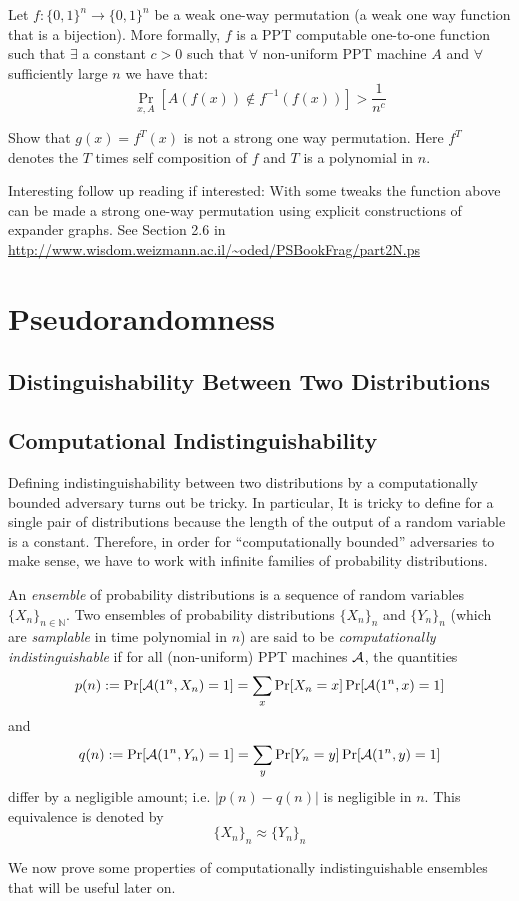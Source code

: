 \documentclass[12pt]{tufte-book}
\begin{document}
\begin{exercise}
 Let $f:\{0,1\}^n\to \{0,1\}^{n}$ be a weak one-way permutation (a weak one way function that is a bijection). More formally, $f$ is a PPT computable one-to-one function such that $\exists$ a constant $c >0$ such that $\forall$ non-uniform PPT machine $A$ and $\forall$ sufficiently large $n$ we have that:
    \[\Pr_{x,A}[A(f(x)) \not\in f^{-1}(f(x))] > \frac{1}{n^c}\]

     Show that $g(x) = f^T(x)$ is not a strong one way permutation. Here $f^T$ denotes the $T$ times self composition of $f$ and $T$ is a polynomial in $n$.

     Interesting follow up reading if interested: With some tweaks the function above can be made a strong one-way permutation using explicit constructions of expander graphs. See Section 2.6 in \url{http://www.wisdom.weizmann.ac.il/~oded/PSBookFrag/part2N.ps}
\end{exercise}




 \chapter{Pseudorandomness}

\section{Distinguishability Between Two Distributions}
\section{Computational Indistinguishability}

Defining indistinguishability between two distributions by a computationally bounded adversary turns out be tricky. In particular, It is tricky to define for a single pair of distributions because the length of the output of a random variable is a constant. Therefore, in order for ``computationally bounded'' adversaries to make sense, we have to work with infinite families of probability distributions.

\begin{definition}
An \emph{ensemble} of probability distributions is a sequence of random variables $\{X_n\}_{n\in \mathbb{N}}$. Two ensembles of probability distributions $\{X_n\}_n$ and $\{Y_n\}_n$ (which are \emph{samplable} in time polynomial in $n$) are said to be \emph{computationally indistinguishable} if for all (non-uniform) PPT machines $\mathcal{A}$, the quantities
$$p(n) := \Pr[\mathcal{A}(1^n, X_n) = 1] = \sum_x \Pr[X_n = x]\Pr[\mathcal{A}(1^n,x) = 1]$$
and
$$q(n) := \Pr[\mathcal{A}(1^n,Y_n) = 1] = \sum_y \Pr[Y_n = y]\Pr[\mathcal{A}(1^n,y) = 1]$$
differ by a negligible amount; i.e. $|p(n) - q(n)|$ is negligible in $n$.    
This equivalence is denoted by
$$\{X_n\}_n\approx \{Y_n\}_n$$
\end{definition}
We now prove some properties of computationally indistinguishable ensembles that will be useful later on.
\end{document}

